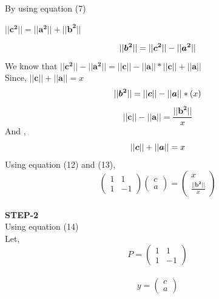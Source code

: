 \documentclass[10pt,a4paper]{report}
\begin{document}
\begin{multicols}{2}
By using equation (7)
\begin{center}
    $ ||\boldsymbol{c^2}|| = ||\boldsymbol{a^2}|| + ||\boldsymbol{b^2}||$ \vspace{2mm}
\end{center}
\begin{equation}
    ||\boldsymbol{b^2}|| = ||\boldsymbol{c^2}|| - ||\boldsymbol{a^2}|| \vspace{2mm}
\end{equation}
We know that $||\boldsymbol{c^2}||- ||\boldsymbol{a^2}|| =  ||\boldsymbol{c}||-||\boldsymbol{a}||*||\boldsymbol{c}||+||\boldsymbol{a}||$\vspace{2mm}\\
Since, $ ||\boldsymbol{c}||+||\boldsymbol{a}||=x$
\begin{equation}
   ||\boldsymbol{b^2}|| = ||\boldsymbol{c}||-||\boldsymbol{a}||*(x) \vspace{2mm}
\end{equation}
\begin{equation}
 ||\boldsymbol{c}||-||\boldsymbol{a}|| = \frac{ ||\boldsymbol{b^2}||}{x}
\end{equation}
And ,
\begin{equation}
  ||\boldsymbol{c}||+||\boldsymbol{a}|| = x \vspace{2mm}
\end{equation}
Using equation (12) and (13),
\begin{equation}
  \begin{pmatrix}
1 & 1\\
1 &-1
\end{pmatrix} 
\begin{pmatrix}
c\\
a
\end{pmatrix} = \begin{pmatrix}
x\\
\frac{||\boldsymbol{b^2}||}{x}
\end{pmatrix} 
\end{equation}\vspace{2mm}\\

\textbf{STEP-2}\vspace{2mm}\\
Using equation (14) \vspace{2mm}\\
 Let,
\begin{equation}
  P =\begin{pmatrix}
1 & 1\\
1 &-1
\end{pmatrix} 
\end{equation} \\ \vspace{2mm}
\begin{equation}
  y =\begin{pmatrix}
c \\
a
\end{pmatrix} 
\end{equation}  \vspace{2mm}


\end{multicols}
\end{document}
